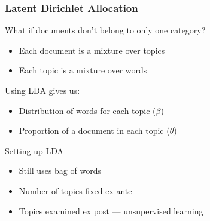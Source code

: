 \documentclass[11pt,compress,professionalfonts]{beamer}
\newcommand{\ita}{\begin{itemize}}
\newcommand{\itm}{\item[]}
\newcommand{\itz}{\end{itemize}}
\begin{document}









\begin{frame}[t,fragile]\frametitle{Latent Dirichlet Allocation}
What if documents don't belong to only one category?
\ita
\itm Each document is a mixture over topics
\itm Each topic is a mixture over words
\itz
Using LDA gives us:
\ita
\itm Distribution of words for each topic ($\beta$)
\itm Proportion of a document in each topic ($\theta$)
\itz
Setting up LDA
\ita
\itm Still uses bag of words
\itm Number of topics fixed ex ante
\itm Topics examined ex post --- unsupervised learning
\itz
\end{frame}
\end{document}
